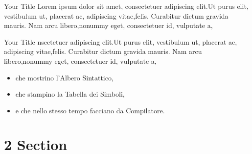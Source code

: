 \documentclass[aspectratio  =  169, 15pt]{beamer}
\begin{document}
    \begin{frame}{Your Title}
        Lorem ipsum dolor sit amet, consectetuer adipiscing elit.Ut purus elit, vestibulum ut, placerat ac, adipiscing vitae,felis. Curabitur dictum gravida mauris. Nam arcu libero,nonummy eget, consectetuer id, vulputate a,
    \end{frame}
    
    
    \begin{frame}{Your Title}
        nsectetuer adipiscing elit.Ut purus elit, vestibulum ut, placerat ac, adipiscing vitae,felis. Curabitur dictum gravida mauris. Nam arcu libero,nonummy eget, consectetuer id, vulputate a,
        
        \begin{itemize}
        	\item che mostrino l'{\color{mauve}Albero Sintattico},
        	\item che stampino la {\color{orange}Tabella dei Simboli},
        	\item e che nello stesso tempo facciano da {\color{blue}Compilatore}.
        \end{itemize}
    \end{frame}
    
    \section{2 Section}
    
\end{document}
